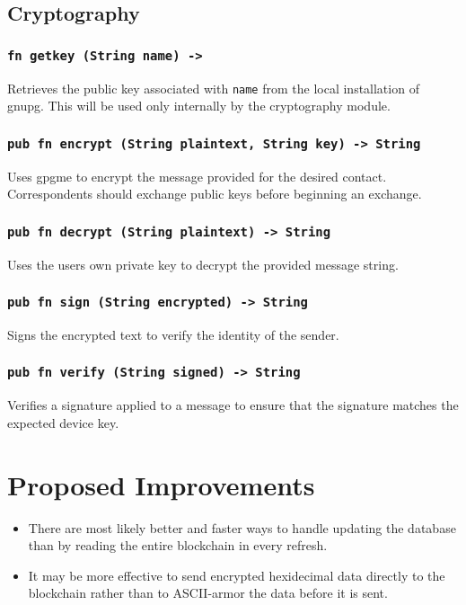 \documentclass[]{article}
\begin{document}
\subsection{Cryptography}
\subsubsection{\texttt{fn getkey (String name) -> }}
Retrieves the public key associated with \verb|name| from the local installation of gnupg. This will be used only internally by the cryptography module.
\subsubsection{\texttt{pub fn encrypt (String plaintext, String key) -> String}}
Uses gpgme to encrypt the message provided for the desired contact. Correspondents should exchange public keys before beginning an exchange.
\subsubsection{\texttt{pub fn decrypt (String plaintext) -> String}}
Uses the users own private key to decrypt the provided message string.
\subsubsection{\texttt{pub fn sign (String encrypted) -> String}}
Signs the encrypted text to verify the identity of the sender.
\subsubsection{\texttt{pub fn verify (String signed) -> String}}
Verifies a signature applied to a message to ensure that the signature matches the expected device key.

\section{Proposed Improvements}
\begin{itemize}
  \item There are most likely better and faster ways to handle updating the database than by reading the entire blockchain in every refresh.
  \item It may be more effective to send encrypted hexidecimal data directly to the blockchain rather than to ASCII-armor the data before it is sent.
\end{itemize}

\pagebreak

  \printbibliography{}
\end{document}
